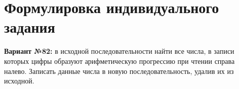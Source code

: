 \section{Формулировка индивидуального задания}

\textbf{Вариант №82:} в исходной последовательности найти все числа, в записи которых цифры образуют арифметическую прогрессию при чтении справа налево. Записать данные числа в новую последовательность, удалив их из исходной.
